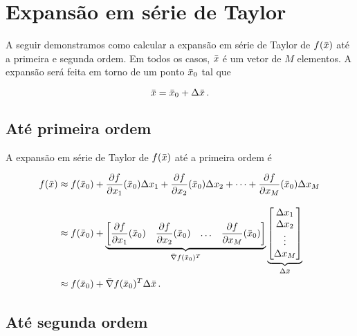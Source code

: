 \section{Expansão em série de Taylor}

A seguir demonstramos como calcular a expansão em série de Taylor de
$f(\bar{x})$ até a primeira e segunda ordem.
Em todos os casos, $\bar{x}$ é um vetor de $M$ elementos.
A expansão será feita em torno de um ponto $\bar{x}_0$ tal que

\begin{equation}
\bar{x} = \bar{x}_0 + \Delta\bar{x} \thinspace .
\end{equation}

\subsection{Até primeira ordem}

A expansão em série de Taylor de $f(\bar{x})$ até a primeira ordem é

\begin{equation}
\begin{split}
f(\bar{x}) &\approx
    f(\bar{x}_0) +
    \dfrac{\partial f}{\partial x_1}(\bar{x}_0) \Delta x_1 + 
    \dfrac{\partial f}{\partial x_2}(\bar{x}_0) \Delta x_2 +
    \dotsb + 
    \dfrac{\partial f}{\partial x_M}(\bar{x}_0) \Delta x_M
\\[0.3cm] &\approx
    f(\bar{x}_0) +
    \underbrace{
    \begin{bmatrix}
    \dfrac{\partial f}{\partial x_1}(\bar{x}_0) &
    \dfrac{\partial f}{\partial x_2}(\bar{x}_0) &
    \ldots &
    \dfrac{\partial f}{\partial x_M}(\bar{x}_0)
    \end{bmatrix}}_{\bar{\nabla}f(\bar{x}_0)^T}
    \underbrace{
    \begin{bmatrix}
    \Delta x_1 \\ \Delta x_2 \\ \vdots \\ \Delta x_M
    \end{bmatrix}}_{\Delta\bar{x}}
\\
&\approx f(\bar{x}_0) + \bar{\nabla}f(\bar{x}_0)^T \Delta\bar{x}
\thinspace .
\end{split}
\label{eq:taylor_order1}
\end{equation}

\subsection{Até segunda ordem}

